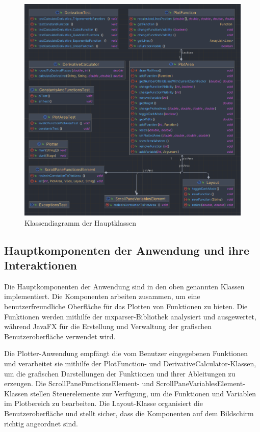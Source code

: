 \documentclass[a4paper]{article}
\begin{document}
\begin{figure}[h]
\centering
\includegraphics[width=\textwidth]{Resources/class_diagram.png}
\caption{Klassendiagramm der Hauptklassen}
\label{fig:class_diagram}
\end{figure}

\subsection{Hauptkomponenten der Anwendung und ihre Interaktionen}

Die Hauptkomponenten der Anwendung sind in den oben genannten Klassen implementiert. Die Komponenten arbeiten zusammen, um eine benutzerfreundliche Oberfläche für das Plotten von Funktionen zu bieten. Die Funktionen werden mithilfe der mxparser-Bibliothek analysiert und ausgewertet, während JavaFX für die Erstellung und Verwaltung der grafischen Benutzeroberfläche verwendet wird.

Die Plotter-Anwendung empfängt die vom Benutzer eingegebenen Funktionen und verarbeitet sie mithilfe der PlotFunction- und DerivativeCalculator-Klassen, um die grafischen Darstellungen der Funktionen und ihrer Ableitungen zu erzeugen. Die ScrollPaneFunctionsElement- und ScrollPaneVariablesElement-Klassen stellen Steuerelemente zur Verfügung, um die Funktionen und Variablen im Plotbereich zu bearbeiten. Die Layout-Klasse organisiert die Benutzeroberfläche und stellt sicher, dass die Komponenten auf dem Bildschirm richtig angeordnet sind.
\end{document}
